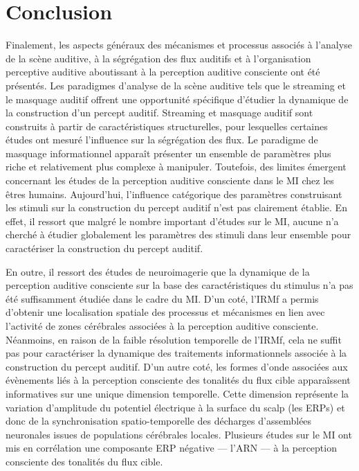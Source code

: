 \section{Conclusion}
\label{conclusionchapitre1}

Finalement, les aspects généraux des mécanismes et processus associés à l'analyse de la scène auditive, à la ségrégation des flux auditifs et à l'organisation perceptive auditive aboutissant à la perception auditive consciente ont été présentés. 
Les paradigmes d'analyse de la scène auditive tels que le streaming et le masquage auditif offrent une opportunité spécifique d'étudier la dynamique de la construction d'un percept auditif. 
Streaming et masquage auditif sont construits à partir de caractéristiques structurelles, pour lesquelles certaines études ont mesuré l'influence sur la ségrégation des flux.  
Le paradigme de masquage informationnel apparaît présenter un ensemble de paramètres plus riche et relativement plus complexe à manipuler. 
Toutefois, des limites émergent concernant les études de la perception auditive consciente dans le MI chez les êtres humains. 
Aujourd'hui, l'influence catégorique des paramètres construisant les stimuli sur la construction du percept auditif n'est pas clairement établie. 
En effet, il ressort que malgré le nombre important d'études sur le MI, aucune n'a cherché à étudier globalement les paramètres des stimuli dans leur ensemble pour caractériser la construction du percept auditif. 

En outre, il ressort des études de neuroimagerie que la dynamique de la perception auditive consciente sur la base des caractéristiques du stimulus n'a pas été suffisamment étudiée dans le cadre du MI. 
D'un coté, l'IRMf a permis d'obtenir une localisation spatiale des processus et mécanismes en lien avec l'activité de zones cérébrales associées à la perception auditive consciente. 
Néanmoins, en raison de la faible résolution temporelle de l'IRMf, cela ne suffit pas pour caractériser la dynamique des traitements informationnels associée à la construction du percept auditif. 
D'un autre coté, les formes d'onde associées aux évènements liés à la perception consciente des tonalités du flux cible apparaîssent informatives sur une unique dimension temporelle. 
Cette dimension représente la variation d'amplitude du potentiel électrique à la surface du scalp (les ERPs) et donc de la synchronisation spatio-temporelle des décharges d'assemblées neuronales issues de populations cérébrales locales. 
Plusieurs études sur le MI ont mis en corrélation une composante ERP négative --- l'ARN --- à la perception consciente des tonalités du flux cible. 

